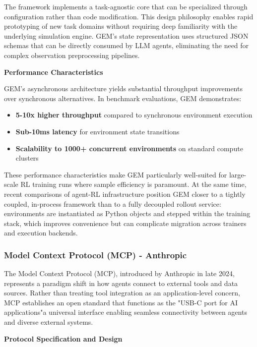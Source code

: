 The framework implements a task-agnostic core that can be specialized through configuration rather than code modification. This design philosophy enables rapid prototyping of new task domains without requiring deep familiarity with the underlying simulation engine. GEM's state representation uses structured JSON schemas that can be directly consumed by LLM agents, eliminating the need for complex observation preprocessing pipelines.

\textbf{Performance Characteristics}

GEM's asynchronous architecture yields substantial throughput improvements over synchronous alternatives. In benchmark evaluations, GEM demonstrates:

\begin{itemize}
    \item \textbf{5-10x higher throughput} compared to synchronous environment execution
    \item \textbf{Sub-10ms latency} for environment state transitions
    \item \textbf{Scalability to 1000+ concurrent environments} on standard compute clusters

\end{itemize}
These performance characteristics make GEM particularly well-suited for large-scale RL training runs where sample efficiency is paramount. At the same time, recent comparisons of agent-RL infrastructure position GEM closer to a tightly coupled, in-process framework than to a fully decoupled rollout service: environments are instantiated as Python objects and stepped within the training stack, which improves convenience but can complicate migration across trainers and execution backends.

\subsubsection{Model Context Protocol (MCP) - Anthropic}

The Model Context Protocol (MCP), introduced by Anthropic in late 2024, represents a paradigm shift in how agents connect to external tools and data sources. Rather than treating tool integration as an application-level concern, MCP establishes an open standard that functions as the "USB-C port for AI applications"a universal interface enabling seamless connectivity between agents and diverse external systems.

\textbf{Protocol Specification and Design}

